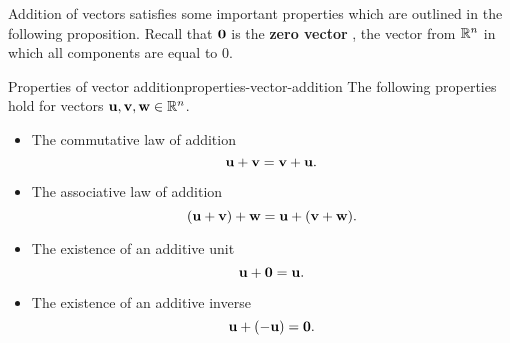 Addition of vectors satisfies some important properties which are
outlined in the following proposition.  Recall that $\vect{0}$ is the
\textbf{zero vector}%
%
, the vector from $\mathbb{R}^n$ in which all
components are equal to $0$.

\begin{proposition}{Properties of vector addition}{properties-vector-addition}
  The following properties hold for vectors
  $\vect{u},\vect{v},\vect{w}\in\R^n$.%
  \begin{itemize}
  \item The commutative law of addition%
    \begin{equation*}
      \vect{u}+\vect{v}=\vect{v}+\vect{u}.
    \end{equation*}
  \item The associative law of addition
    \begin{equation*}
      (\vect{u}+\vect{v})+\vect{w} = \vect{u}+(\vect{v}+\vect{w}).
    \end{equation*}
  \item The existence of an additive unit%
    \begin{equation*}
      \vect{u}+\vect{0}=\vect{u}.
    \end{equation*}
  \item The existence of an additive inverse
    \begin{equation*}
      \vect{u}+(-\vect{u}) =\vect{0}.
    \end{equation*}
  \end{itemize}
\end{proposition}

